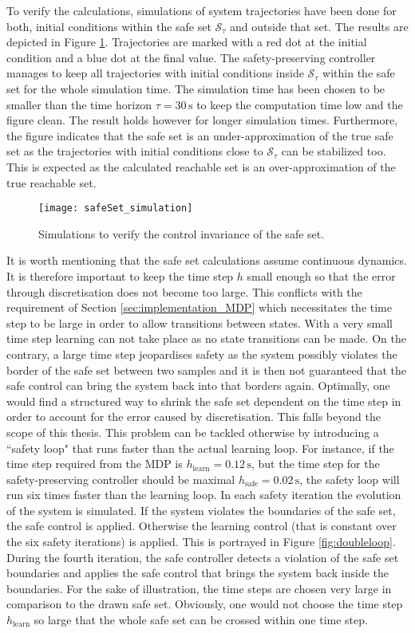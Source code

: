 \documentclass[../main.tex]{subfiles}
\begin{document}
To verify the calculations, simulations of system trajectories have been done for both, initial conditions within the safe set $\mathcal{S}_\tau$ and outside that set. The results are depicted in Figure \ref{fig:safeSet_simulation}. Trajectories are marked with a red dot at the initial condition and a blue dot at the final value. The safety-preserving controller manages to keep all trajectories with initial conditions inside $\mathcal{S}_\tau$ within the safe set for the whole simulation time. The simulation time has been chosen to be smaller than the time horizon $\tau = 30 \,\text{s}$ to keep the computation time low and the figure clean. The result holds however for longer simulation times. Furthermore, the figure indicates that the safe set is an under-approximation of the true safe set as the trajectories with initial conditions close to $\mathcal{S}_\tau$ can be stabilized too. This is expected as the calculated reachable set is an over-approximation of the true reachable set. \par
\begin{figure}[h]
    \centering
    \texttt{[image: safeSet\_simulation]}
        \caption{Simulations to verify the control invariance of the safe set.}    
    \label{fig:safeSet_simulation}
\end{figure}
It is worth mentioning that the safe set calculations assume continuous dynamics. It is therefore important to keep the time step $h$ small enough so that the error through discretisation does not become too large. This conflicts with the requirement of Section \ref{sec:implementation_MDP} which necessitates the time step to be large in order to allow transitions between states. With a very small time step learning can not take place as no state transitions can be made. On the contrary, a large time step jeopardises safety as the system possibly violates the border of the safe set between two samples and it is then not guaranteed that the safe control can bring the system back into that borders again. Optimally, one would find a structured way to shrink the safe set dependent on the time step in order to account for the error caused by discretisation. This falls beyond the scope of this thesis. This problem can be tackled otherwise by introducing a ``safety loop" that runs faster than the actual learning loop. For instance, if the time step required from the MDP is $h_{\text{learn}} = 0.12\,\text{s}$, but the time step for the safety-preserving controller should be maximal $h_{\text{safe}} = 0.02\,\text{s}$, the safety loop will run six times faster than the learning loop. In each safety iteration the evolution of the system is simulated. If the system violates the boundaries of the safe set, the safe control is applied. Otherwise the learning control (that is constant over the six safety iterations) is applied. This is portrayed in Figure \ref{fig:doubleloop}. During the fourth iteration, the safe controller detects a violation of the safe set boundaries and applies the safe control that brings the system back inside the boundaries. For the sake of illustration, the time steps are chosen very large in comparison to the drawn safe set. Obviously, one would not choose the time step $h_{\text{learn}}$ so large that the whole safe set can be crossed within one time step.
\end{document}
